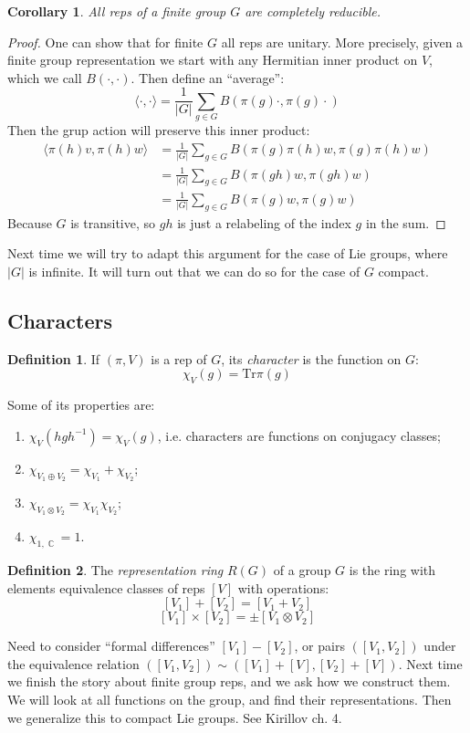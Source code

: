 \documentclass[12 pt]{article}
\DeclareMathOperator {\C} {\mathbb{C}}
\theoremstyle{plain}
\newtheorem{cor}[thm]{Corollary}
\theoremstyle{definition}
\newtheorem{defn}{Definition}
\theoremstyle{remark}
\begin{document}
\begin{cor}
All reps of a finite group $G$ are completely reducible.
\end{cor}
\begin{proof}
One can show that for finite $G$ all reps are unitary. More precisely, given a finite group representation we start with any Hermitian inner product on $V$, which we call $B(\cdot, \cdot)$. Then define an ``average'':
\[  \langle \cdot , \cdot \rangle  = \frac{1}{|G|} \sum_{g\in G} B (\pi(g) \cdot , \pi(g) \cdot)   \]
Then the grup action will preserve this inner product:
\begin{align*}
\langle \pi(h) v, \pi(h) w \rangle &= \frac{1}{|G|} \sum_{g\in G} B(\pi(g) \pi(h) w , \pi(g)\pi(h) w )   \\
 &= \frac{1}{|G|} \sum_{g\in G} B(\pi(gh) w , \pi(gh) w )  \\
&= \frac{1}{|G|} \sum_{g\in G} B(\pi(g) w , \pi(g) w ) 
\end{align*}
Because $G$ is transitive, so $gh$ is just a relabeling of the index $g$ in the sum.
\end{proof}
Next time we will try to adapt this argument for the case of Lie groups, where $|G|$ is infinite. It will turn out that we can do so for the case of $G$ compact.

\subsection*{Characters}
\begin{defn}
If $(\pi, V)$ is a rep of $G$, its \emph{character} is the function on $G$:
\[      \chi_V (g) = \text{Tr} \pi(g)      \]
\end{defn}
Some of its properties are:
\begin{enumerate} [(1)]
\item $\chi_V (hgh^{-1}) = \chi_V(g)$, i.e. characters are functions on conjugacy classes;
\item $\chi_{V_1 \oplus V_2} = \chi_{V_1} + \chi_{V_2}$;
\item $\chi_{V_1 \otimes V_2} = \chi_{V_1}  \chi_{V_2}$;
\item $\chi_{1,\C} = 1$.
\end{enumerate}
\begin{defn}
The \emph{representation ring} $R(G)$ of a group $G$ is the ring with elements equivalence classes of reps $[V]$ with operations:
\[    [V_1] + [V_2] = [V_1 + V_2]     \]
\[    [V_1] \times [V_2] = \pm [V_1 \otimes V_2]     \]
\end{defn}
Need to consider ``formal differences'' $[V_1] - [V_2]$, or pairs $([V_1, V_2])$ under the equivalence relation $([V_1, V_2]) \sim ([V_1] + [V] , [V_2] + [V])$.
Next time we finish the story about finite group reps, and we ask how we construct them. We will look at all functions on the group, and find their representations. Then we generalize this to compact Lie groups. See Kirillov ch. 4.
\end{document}

